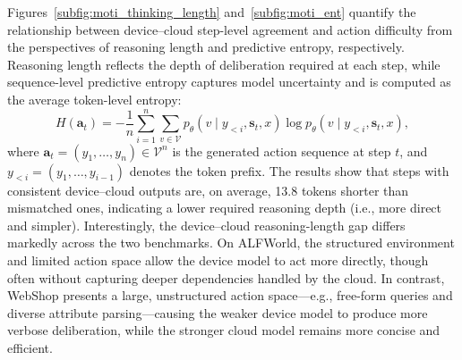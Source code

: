 \documentclass{article}
\begin{document}
Figures~\ref{subfig:moti_thinking_length} and~\ref{subfig:moti_ent} quantify the relationship between device--cloud step-level agreement and action difficulty from the perspectives of reasoning length and predictive entropy, respectively.
Reasoning length reflects the depth of deliberation required at each step, while sequence-level predictive entropy captures model uncertainty and is computed as the average token-level entropy:
\begin{equation}
H(\mathbf{a}_t) = -\frac{1}{n} \sum_{i=1}^{n} \sum_{v \in \mathcal{V}} p_\theta(v \mid y_{<i}, \mathbf{s}_t, x) \log p_\theta(v \mid y_{<i}, \mathbf{s}_t, x),
\end{equation}
where $\mathbf{a}_t = (y_1, \dots, y_n) \in \mathcal{V}^n$ is the generated action sequence at step $t$, and $y_{<i} = (y_1, \dots, y_{i-1})$ denotes the token prefix.
The results show that steps with consistent device--cloud outputs are, on average, 13.8 tokens shorter than mismatched ones, indicating a lower required reasoning depth (i.e., more direct and simpler).
Interestingly, the device--cloud reasoning-length gap differs markedly across the two benchmarks.
On ALFWorld, the structured environment and limited action space allow the device model to act more directly, though often without capturing deeper dependencies handled by the cloud. In contrast, WebShop presents a large, unstructured action space—e.g., free-form queries and diverse attribute parsing—causing the weaker device model to produce more verbose deliberation, while the stronger cloud model remains more concise and efficient.
\end{document}
